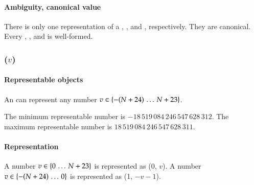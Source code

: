 \paragraph{Ambiguity, canonical value}

There is only one representation of a \DborMinusZeroValue,
\DborInfinityValue, and \DborMinusInfinityValue, respectively.
They are canonical.
Every \DborMinusZeroValue, \DborInfinityValue,
and \DborMinusInfinityValue{} is well-formed.


\subsubsection{\DborIntegerValue(\texorpdfstring{$v$}{v})}
\hypertarget{sec:def:IntegerValue}{}

\paragraph{Representable objects}

An \DborIntegerValue{} can represent any number $v \in \{-(N + 24) \,\ldots\, N + 23\}$.

\smallskip
The minimum representable number is $-18\,519\,084\,246\,547\,628\,312$.
The maximum representable number is $18\,519\,084\,246\,547\,628\,311$.

\paragraph{Representation}

A number $v \in \{0 \,\ldots\, N + 23\}$ is represented as \DborIntegerToken*(0, $v$).
A number $v \in \{-(N + 24) \,\ldots\, 0\}$ is represented as \DborIntegerToken*(1, $-v - 1$).

